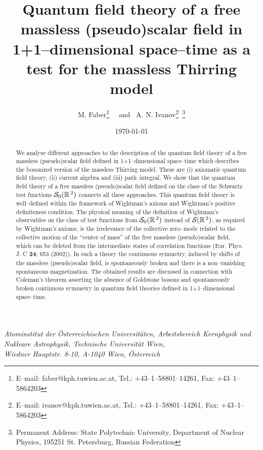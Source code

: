 \documentclass[a4paper,12pt] {article}
\begin{document}
\setcounter{page}{1}
\def\theequation{\arabic{section}.\arabic{equation}}
\def\theequation{\thesection.\arabic{equation}}
\setcounter{section}{0}

\title{Quantum field theory of a free massless (pseudo)scalar field in
1+1--dimensional space--time as a test for the massless Thirring model
}

\author{M. Faber\thanks{E--mail: faber@kph.tuwien.ac.at, Tel.:
+43--1--58801--14261, Fax: +43--1--5864203} ~~and~
A. N. Ivanov\thanks{E--mail: ivanov@kph.tuwien.ac.at, Tel.:
+43--1--58801--14261, Fax: +43--1--5864203}~\thanks{Permanent Address:
State Polytechnic University, Department of Nuclear Physics, 195251
St. Petersburg, Russian Federation}}

\date{\today}

\maketitle
\vspace{-0.5in}
\begin{center}
{\it Atominstitut der \"Osterreichischen Universit\"aten,
Arbeitsbereich Kernphysik und Nukleare Astrophysik, Technische
Universit\"at Wien, \\ Wiedner Hauptstr. 8-10, A-1040 Wien,
\"Osterreich }
\end{center}

\begin{center}
\begin{abstract}
We analyse different approaches to the description of the quantum
field theory of a free massless (pseudo)scalar field defined in
1+1--dimensional space--time which describes the bosonized version of
the massless Thirring model. These are (i) axiomatic quantum field
theory, (ii) current algebra and (iii) path--integral. We show that
the quantum field theory of a free massless (pseudo)scalar field
defined on the class of the Schwartz test functions ${\cal
S}_0(\mathbb{R}^{\,2})$ connects all these approaches. This quantum
field theory is well--defined within the framework of Wightman's
axioms and Wightman's positive definiteness condition. The physical
meaning of the definition of Wightman's observables on the class of
test functions from ${\cal S}_0(\mathbb{R}^{\,2})$ instead of ${\cal
S}(\mathbb{R}^{\,2})$, as required by Wightman's axioms, is the
irrelevance of the collective zero--mode related to the collective
motion of the ``center of mass'' of the free massless (pseudo)scalar
field, which can be deleted from the intermediate states of
correlation functions (Eur. Phys. J. C {\bf 24}; 653 (2002)).  In such
a theory the continuous symmetry, induced by shifts of the massless
(pseudo)scalar field, is spontaneously broken and there is a
non--vanishing spontaneous magnetization. The obtained results are
discussed in connection with Coleman's theorem asserting the absence
of Goldstone bosons and spontaneously broken continuous symmetry in
quantum field theories defined in 1+1--dimensional space--time.
\end{abstract}
\end{center}
\end{document}
